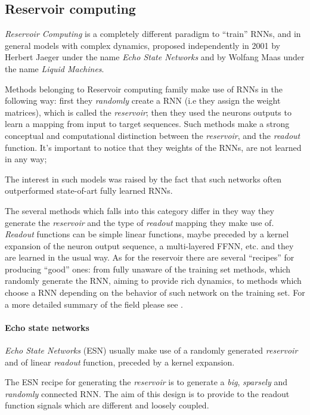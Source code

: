 \subsection{Reservoir computing} 
\label{sec:reservoir}

\textit{Reservoir Computing} is a completely different paradigm to ``train'' RNNs, and in general models with complex 
dynamics, proposed independently in 2001 by Herbert Jaeger under the name \textit{Echo State 
Networks}\cite{echoStateNetworks} and by Wolfang Maas under the name \textit{Liquid Machines}\cite{liquidStateMachines}.

Methods belonging to Reservoir computing family make use of RNNs in the following way: first they \textit{randomly} 
create a RNN (i.e they assign the weight matrices), which is called the \textit{reservoir}; then they used the neurons
outputs to learn a mapping from input to target sequences.
Such methods make a strong conceptual and computational distinction between the \textit{reservoir}, and the 
\textit{readout} function.
It's important to notice that they weights of the RNNs, are not learned in any way;

The interest in such models was raised by the fact that such networks often outperformed state-of-art fully learned 
RNNs.


The several methods which falls into this category differ in they way they generate the \textit{reservoir} and the type 
of \textit{readout} mapping they make use of. \textit{Readout} functions can be simple linear functions, maybe preceded 
by a kernel expansion of the neuron output sequence, a multi-layered FFNN, etc. and they are learned in the usual way.
As for the reservoir there are several ``recipes'' for producing ``good'' ones: from fully unaware of the training set 
methods, which randomly generate the RNN, aiming to provide rich dynamics, to methods which choose a RNN depending on 
the behavior of such network on the training set.
For a more detailed summary of the field please see \cite{reservoirSummary}.


\paragraph{Echo state networks}

\textit{Echo State Networks} (ESN) usually make use of a randomly generated \textit{reservoir} and of linear 
\textit{readout} function, preceded by a kernel expansion.

The ESN recipe for generating the \textit{reservoir} is to generate a \textit{big}, \textit{sparsely} and 
\textit{randomly} connected RNN. The aim of this design is to provide to the readout function signals which are 
different and loosely coupled.

